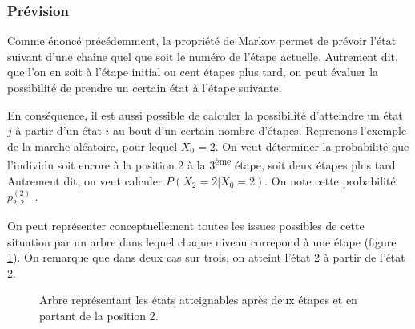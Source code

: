 \documentclass[12pt]{article}
\begin{document}
\subsubsection{Prévision}

Comme énoncé précédemment, la propriété de Markov permet de prévoir
l'état suivant d'une chaîne quel que soit le numéro de l'étape
actuelle. Autrement dit, que l'on en soit à l'étape initial ou cent
étapes plus tard, on peut évaluer la possibilité de prendre un certain
état à l'étape suivante.

En conséquence, il est aussi possible de calculer la possibilité
d'atteindre un état $j$ à partir d'un état $i$ au bout d'un certain
nombre d'étapes. Reprenons l'exemple de la marche aléatoire, pour
lequel $X_0 = 2$. On veut déterminer la probabilité que l'individu
soit encore à la position 2 à la 3\textsuperscript{ème} étape, soit
deux étapes plus tard. Autrement dit, on veut calculer $P(X_2 = 2 |
X_0 = 2)$. On note cette probabilité $p^{(2)}_{2,2}$ \cite{green}.

On peut représenter conceptuellement toutes les issues possibles de
cette situation par un arbre dans lequel chaque niveau correpond à une
étape (figure \ref{arbre}). On remarque que dans deux cas sur trois,
on atteint l'état 2 à partir de l'état 2.

\begin{figure}[H]
  \centering


  \caption{Arbre représentant les états atteignables après deux étapes
    et en partant de la position 2.}
  \label{arbre}

\end{figure}
\end{document}
